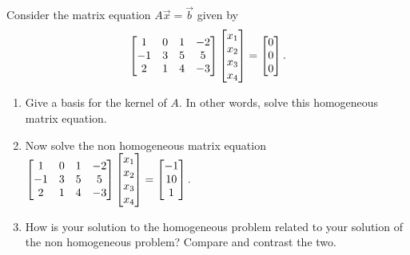 \begin{problem}
Consider the matrix equation $A\vec x=\vec b$ given by 
$$\begin{bmatrix}
\begin{matrix} 1\\-1\\2 \end{matrix}&
\begin{matrix} 0\\3\\1 \end{matrix}&
\begin{matrix} 1\\5\\4 \end{matrix}&
\begin{matrix} -2\\5\\-3 \end{matrix}
\end{bmatrix}
\begin{bmatrix}x_1\\x_2\\x_3\\x_4\end{bmatrix}
=
\begin{bmatrix}0\\0\\0\end{bmatrix}.$$ 
\begin{enumerate}
 \item Give a basis for the kernel of $A$. In other words, solve this homogeneous matrix equation.
 \item Now solve the non homogeneous matrix equation
$\begin{bmatrix}
\begin{matrix} 1\\-1\\2 \end{matrix}&
\begin{matrix} 0\\3\\1 \end{matrix}&
\begin{matrix} 1\\5\\4 \end{matrix}&
\begin{matrix} -2\\5\\-3 \end{matrix}
\end{bmatrix}
\begin{bmatrix}x_1\\x_2\\x_3\\x_4\end{bmatrix}
=
\begin{bmatrix}-1\\10\\1\end{bmatrix}.$ 

 \item How is your solution to the homogeneous problem related to your solution of the non homogeneous problem?  Compare and contrast the two. 
\end{enumerate}
\end{problem}

